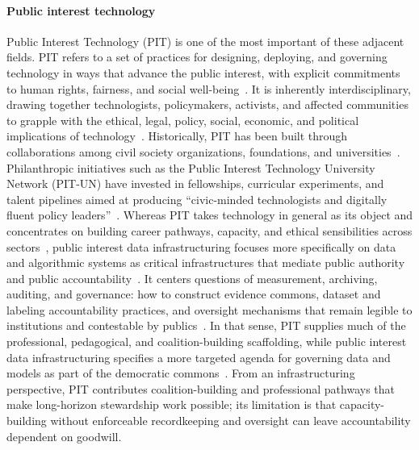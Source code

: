 \documentclass[acmsmall,screen]{acmart}
\begin{document}
\paragraph*{Public interest technology}
Public Interest Technology (PIT) is one of the most important of these adjacent fields. PIT refers to a set of practices for designing, deploying, and governing technology in ways that advance the public interest, with explicit commitments to human rights, fairness, and social well-being~\cite{DefiningPublicInterest,abbasSocioTechnicalDesignPublic2021,washingtonDefiningPublicInterest2024}. It is inherently interdisciplinary, drawing together technologists, policymakers, activists, and affected communities to grapple with the ethical, legal, policy, social, economic, and political implications of technology~\cite{abbasCoDesigningFuturePublic2021,chowdharyCareLiberationCreating2020,stapletonWhoHasInterest2022,chambersBigTechAdvocacy2025}. Historically, PIT has been built through collaborations among civil society organizations, foundations, and universities~\cite{kramerBuildingFieldPublic,luskPublicInterestTechnology2021}. Philanthropic initiatives such as the Public Interest Technology University Network (PIT-UN) have invested in fellowships, curricular experiments, and talent pipelines aimed at producing ``civic-minded technologists and digitally fluent policy leaders''~\cite{luskPublicInterestTechnology2021,kramerBuildingFieldPublic}. Whereas PIT takes technology in general as its object and concentrates on building career pathways, capacity, and ethical sensibilities across sectors~\cite{mcguinnessPowerPublicPromise2021,knodelShapingProfessionBuilding2025}, public interest data infrastructuring focuses more specifically on data and algorithmic systems as critical infrastructures that mediate public authority and public accountability~\cite{alkhatibStreetLevelAlgorithmsTheory2019,passiTrustDataScience2018a,hutchinsonAccountabilityMachineLearning2021}. It centers questions of measurement, archiving, auditing, and governance: how to construct evidence commons, dataset and labeling accountability practices, and oversight mechanisms that remain legible to institutions and contestable by publics~\cite{mullerDesigningGroundTruth2021,paakkonenBureaucracyLensAnalyzing2020b,greenAlgorithmicRealismExpanding2020}. In that sense, PIT supplies much of the professional, pedagogical, and coalition-building scaffolding, while public interest data infrastructuring specifies a more targeted agenda for governing data and models as part of the democratic commons~\cite{stapletonWhoHasInterest2022,mcguinnessPowerPublicPromise2021,hutchinsonAccountabilityMachineLearning2021}. From an infrastructuring perspective, PIT contributes coalition-building and professional pathways that make long-horizon stewardship work possible; its limitation is that capacity-building without enforceable recordkeeping and oversight can leave accountability dependent on goodwill.
\end{document}
